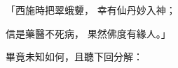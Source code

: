 \begin{showcontents}{}
「西施時把翠蛾顰，  幸有仙丹妙入神；

信是藥醫不死病，  果然佛度有緣人。」

畢竟未知如何，且聽下回分解：




\end{showcontents}


